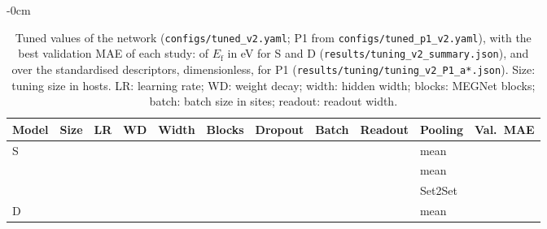 \begin{table}[H]
\caption{Tuned values of the network (\texttt{configs/tuned\_v2.yaml}; P1 from \texttt{configs/tuned\_p1\_v2.yaml}), with the best validation MAE of each study: of $E_\mathrm{f}$ in eV for S and D (\texttt{results/tuning\_v2\_summary.json}), and over the standardised descriptors, dimensionless, for P1 (\texttt{results/tuning/tuning\_v2\_P1\_a*.json}). Size: tuning size in hosts. LR: learning rate; WD: weight decay; width: hidden width; blocks: MEGNet blocks; batch: batch size in sites; readout: readout width.\label{tab:app_tuned}}
\begin{adjustwidth}{-\extralength}{0cm}
\centering
\small
\begin{tabular}{lrllrrlrrlr}
\toprule
Model & Size & LR & WD & Width & Blocks & Dropout & Batch & Readout & Pooling & Val.\ MAE \\
\midrule
S & \numCfgTuningAnchorsItemOne{} & \numTunedVTwoModelsSFiftyLearningRateSig{} & \numTunedVTwoModelsSFiftyWeightDecaySig{} & \numTunedVTwoModelsSFiftyHiddenWidth{} & \numTunedVTwoModelsSFiftyMegnetBlocks{} & \numTunedVTwoModelsSFiftyDropoutSig{} & \numTunedVTwoModelsSFiftyBatchSize{} & \numTunedVTwoModelsSFiftyReadoutMlpWidth{} & mean & \numTuningVTwoSummaryBestSFiftyBestValue{} \\
 & \numCfgTuningAnchorsItemTwo{} & \numTunedVTwoModelsSTwoHundredLearningRateSig{} & \numTunedVTwoModelsSTwoHundredWeightDecaySig{} & \numTunedVTwoModelsSTwoHundredHiddenWidth{} & \numTunedVTwoModelsSTwoHundredMegnetBlocks{} & \numTunedVTwoModelsSTwoHundredDropoutSig{} & \numTunedVTwoModelsSTwoHundredBatchSize{} & \numTunedVTwoModelsSTwoHundredReadoutMlpWidth{} & mean & \numTuningVTwoSummaryBestSTwoHundredBestValue{} \\
 & \numCfgTuningAnchorsItemThree{} & \numTunedVTwoModelsSSixHundredFiftyFourLearningRateSig{} & \numTunedVTwoModelsSSixHundredFiftyFourWeightDecaySig{} & \numTunedVTwoModelsSSixHundredFiftyFourHiddenWidth{} & \numTunedVTwoModelsSSixHundredFiftyFourMegnetBlocks{} & \numTunedVTwoModelsSSixHundredFiftyFourDropoutSig{} & \numTunedVTwoModelsSSixHundredFiftyFourBatchSize{} & \numTunedVTwoModelsSSixHundredFiftyFourReadoutMlpWidth{} & Set2Set & \numTuningVTwoSummaryBestSSixHundredFiftyFourBestValue{} \\
\addlinespace
D & \numCfgTuningAnchorsItemOne{} & \numTunedVTwoModelsDStateFiftyLearningRateSig{} & \numTunedVTwoModelsDStateFiftyWeightDecaySig{} & \numTunedVTwoModelsDStateFiftyHiddenWidth{} & \numTunedVTwoModelsDStateFiftyMegnetBlocks{} & \numTunedVTwoModelsDStateFiftyDropoutSig{} & \numTunedVTwoModelsDStateFiftyBatchSize{} & \numTunedVTwoModelsDStateFiftyReadoutMlpWidth{} & mean & \numTuningVTwoSummaryBestDStateFiftyBestValue{} \\

\end{tabular}
\end{adjustwidth}
\end{table}
